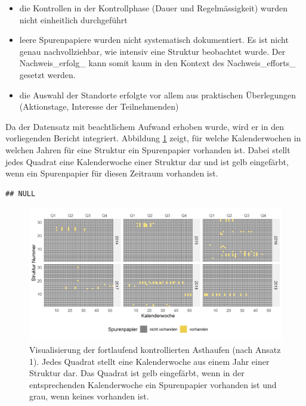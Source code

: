 \documentclass[
]{scrbook}
\providecommand{\tightlist}{%
  \setlength{\itemsep}{0pt}\setlength{\parskip}{0pt}}
\begin{document}
\begin{itemize}
\tightlist
\item
  die Kontrollen in der Kontrollphase (Dauer und Regelmässigkeit) wurden nicht einheitlich durchgeführt
\item
  leere Spurenpapiere wurden nicht systematisch dokumentiert. Es ist nicht genau nachvollziehbar, wie intensiv eine Struktur beobachtet wurde. Der Nachweis\_erfolg\_ kann somit kaum in den Kontext des Nachweis\_efforts\_ gesetzt werden.
\item
  die Auswahl der Standorte erfolgte vor allem aus praktischen Überlegungen (Aktionstage, Interesse der Teilnehmenden)
\end{itemize}

Da der Datensatz mit beachtlichem Aufwand erhoben wurde, wird er in den vorliegenden Bericht integriert. Abbildung \ref{fig:wirkungskontrollespontaneffort} zeigt, für welche Kalenderwochen in welchen Jahren für eine Struktur ein Spurenpapier vorhanden ist. Dabei stellt jedes Quadrat eine Kalenderwoche einer Struktur dar und ist gelb eingefärbt, wenn ein Spurenpapier für diesen Zeitraum vorhanden ist.



\begin{verbatim}
## NULL
\end{verbatim}

\begin{figure}
\includegraphics[width=1\linewidth]{images/wirkungskontrolle_spontan_effort} \caption{Visualisierung der fortlaufend kontrollierten Asthaufen (nach Ansatz 1). Jedes Quadrat stellt eine Kalenderwoche aus einem Jahr einer Struktur dar. Das Quadrat ist gelb eingefärbt, wenn in der entsprechenden Kalenderwoche ein Spurenpapier vorhanden ist und grau, wenn keines vorhanden ist.}\label{fig:wirkungskontrollespontaneffort}
\end{figure}
\end{document}
